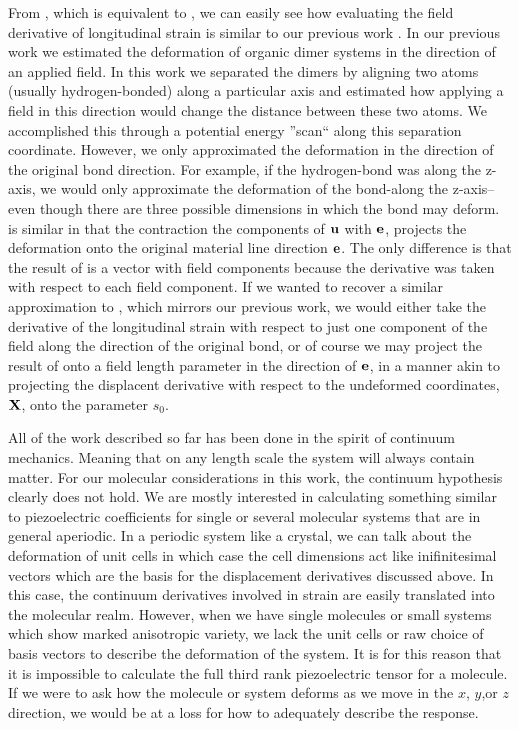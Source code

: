 From , which is equivalent to , we can easily see how evaluating the field derivative of longitudinal strain is similar to our previous work \cite{Werling0,Werling1}.
In our previous work we estimated the deformation of organic dimer systems in the direction of an applied field.  
In this work we separated the dimers by aligning two atoms (usually hydrogen-bonded)
along a particular axis and estimated how applying a field in this direction would change the distance between these two atoms.  
We accomplished this through a potential energy ''scan``
along this separation coordinate.  
However, we only approximated the deformation in the direction of the original bond direction.  
For example, if the hydrogen-bond was along the z-axis,
we would only approximate the deformation of the bond-along the z-axis--even though there are three possible dimensions in which the bond may deform.  
 is similar in that 
the contraction the components of ${{\mathbf u}}$ with ${{\mathbf e}}$, projects the deformation onto the original material line direction ${{\mathbf e}}$.  
The only difference is that the result of 
 is a vector with field components because the derivative was taken with respect to each field component.  
If we wanted to recover a similar approximation to \dtt, which
mirrors our previous work, we would either take the derivative of the longitudinal strain with respect to just one component of the field along 
the direction of the original bond, or of 
course we may project the result of  onto a field length parameter in the direction of ${{\mathbf e}}$, 
in a manner akin to projecting the displacent derivative with respect to the undeformed
coordinates, ${{\mathbf X}}$, onto the parameter $s_0$.  

All of the work described so far has been done in the spirit of continuum mechanics.  
Meaning that on any length scale the system will always contain matter.  
For our molecular considerations in this work, the continuum hypothesis clearly does not hold.  
We are mostly interested in calculating something similar to piezoelectric coefficients for single or several molecular
systems that are in general aperiodic.  
In a periodic system like a crystal, we can talk about the deformation of unit cells in which case the 
cell dimensions act like inifinitesimal vectors which are the basis for the displacement derivatives discussed above.  
In this case, the continuum derivatives involved in strain are easily translated into the molecular realm.  
However, when we have single molecules or small systems which show marked anisotropic variety, we lack the unit cells or raw 
choice of basis vectors to describe the deformation of the 
system.  
It is for this reason that it is impossible to calculate the full third rank piezoelectric tensor for a molecule.  
If we were to ask how the molecule or system deforms as we move in the 
$x$, $y$,or $z$ direction, we would be at a loss for how to adequately describe the response.  

